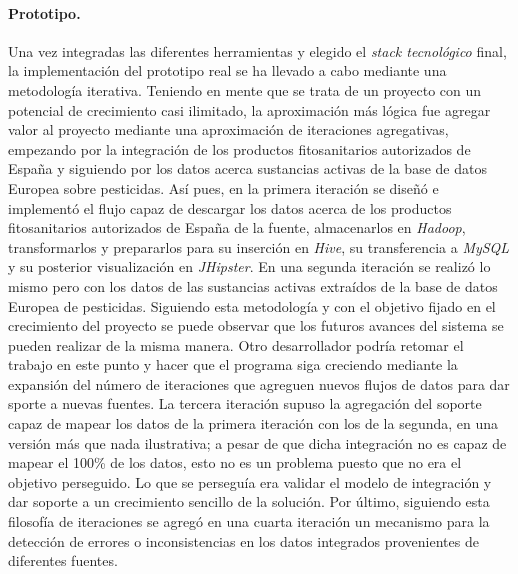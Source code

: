 \paragraph*{Prototipo.} Una vez integradas las diferentes herramientas y elegido el \textit{stack tecnológico} final, la implementación del prototipo real se ha llevado a cabo mediante una metodología iterativa. Teniendo en mente que se trata de un proyecto con un potencial de crecimiento casi ilimitado, la aproximación más lógica fue agregar valor al proyecto mediante una aproximación de iteraciones agregativas, empezando por la integración de los productos fitosanitarios autorizados de España y siguiendo por los datos acerca sustancias activas de la base de datos Europea sobre pesticidas.  Así pues, en la primera iteración se diseñó e implementó el flujo capaz de descargar los datos acerca de los productos fitosanitarios autorizados de España de la fuente, almacenarlos en \textit{Hadoop}, transformarlos y prepararlos para su inserción en \textit{Hive}, su transferencia a \textit{MySQL} y su posterior visualización en \textit{JHipster}. En una segunda iteración se realizó lo mismo pero con los datos de las sustancias activas extraídos de la base de datos Europea de pesticidas. Siguiendo esta metodología y con el objetivo fijado en el crecimiento del proyecto se puede observar que los futuros avances del sistema se pueden realizar de la misma manera. Otro desarrollador podría retomar el trabajo en este punto y hacer que el programa siga creciendo mediante la expansión del número de iteraciones que agreguen nuevos flujos de datos para dar sporte a nuevas fuentes. La tercera iteración supuso la agregación del soporte capaz de mapear los datos de la primera iteración con los de la segunda, en una versión más que nada ilustrativa; a pesar de que dicha integración no es capaz de mapear el 100\% de los datos, esto no es un problema puesto que no era el objetivo perseguido. Lo que se perseguía era validar el modelo de integración y dar soporte a un crecimiento sencillo de la solución. Por último, siguiendo esta filosofía de iteraciones se agregó en una cuarta iteración un mecanismo para la detección de errores o inconsistencias en los datos integrados provenientes de diferentes fuentes. 

